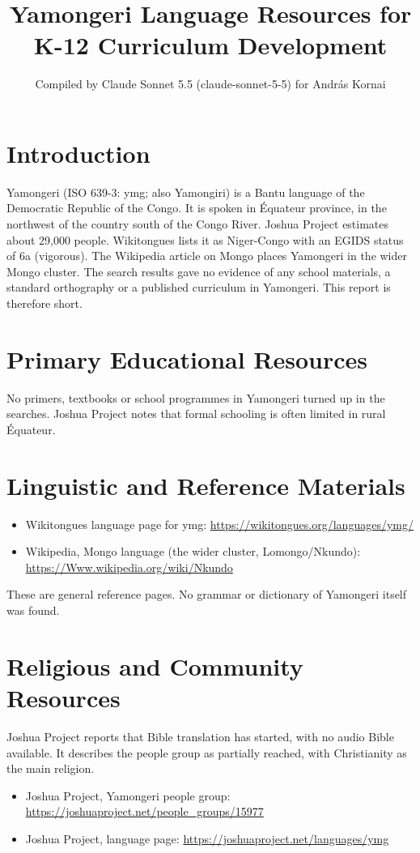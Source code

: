 \documentclass[12pt]{article}
\title{Yamongeri Language Resources for K-12 Curriculum Development}
\author{Compiled by Claude Sonnet 5.5 (claude-sonnet-5-5) for Andr\'as Kornai}
\date{}
\begin{document}
\maketitle

\section{Introduction}
Yamongeri (ISO 639-3: ymg; also Yamongiri) is a Bantu language of the Democratic Republic of the Congo. It is spoken in \'Equateur province, in the northwest of the country south of the Congo River. Joshua Project estimates about 29,000 people. Wikitongues lists it as Niger-Congo with an EGIDS status of 6a (vigorous). The Wikipedia article on Mongo places Yamongeri in the wider Mongo cluster. The search results gave no evidence of any school materials, a standard orthography or a published curriculum in Yamongeri. This report is therefore short.

\section{Primary Educational Resources}
No primers, textbooks or school programmes in Yamongeri turned up in the searches. Joshua Project notes that formal schooling is often limited in rural \'Equateur.

\section{Linguistic and Reference Materials}
\begin{itemize}
\item Wikitongues language page for ymg: \url{https://wikitongues.org/languages/ymg/}
\item Wikipedia, Mongo language (the wider cluster, Lomongo/Nkundo): \url{https://Www.wikipedia.org/wiki/Nkundo}
\end{itemize}
These are general reference pages. No grammar or dictionary of Yamongeri itself was found.

\section{Religious and Community Resources}
Joshua Project reports that Bible translation has started, with no audio Bible available. It describes the people group as partially reached, with Christianity as the main religion.
\begin{itemize}
\item Joshua Project, Yamongeri people group: \url{https://joshuaproject.net/people_groups/15977}
\item Joshua Project, language page: \url{https://joshuaproject.net/languages/ymg}
\end{itemize}
\end{document}
